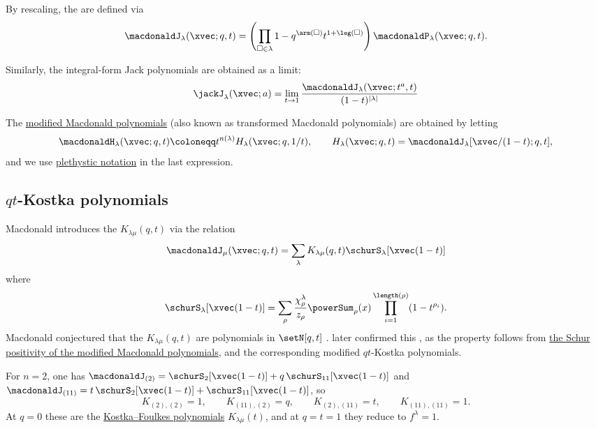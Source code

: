 By rescaling, the
\label{integralFormMacdonaldPolynomial}
are defined via
\begin{equation*}
\macdonaldJ_\lambda(\xvec;q,t)
=
\left(
  \prod_{\square \in \lambda} 1-q^{\arm(\square)}t^{1+\leg(\square)}
\right)
\macdonaldP_\lambda(\xvec;q,t).
\end{equation*}

Similarly, the integral-form Jack polynomials are obtained as a limit:
\[
\jackJ_\lambda(\xvec;a)
=
\lim_{t \to 1}
\frac{\macdonaldJ_\lambda(\xvec;t^a,t)}{(1-t)^{|\lambda|}}
\]

The \hyperref[macdonaldH]{modified Macdonald polynomials}
(also known as transformed Macdonald polynomials) are obtained by letting
\begin{equation*}
\macdonaldH_\lambda(\xvec;q,t) \coloneqq
t^{n(\lambda)}H_\lambda(\xvec;q,1/t),
\qquad
H_\lambda(\xvec;q,t) = \macdonaldJ_\lambda[\xvec/(1-t);q,t],
\end{equation*}
and we use \hyperref[plethysm]{plethystic notation} in the last expression.


\subsection[macdonaldJqtKostka]{$qt$-Kostka polynomials}

Macdonald \cite[p.~354]{Macdonald1987} introduces the
\label{qtKostkaPolynomial}
$K_{\lambda\mu}(q,t)$
via the relation
\[
\macdonaldJ_\mu(\xvec;q,t)
=
\sum_{\lambda} K_{\lambda\mu}(q,t) \schurS_\lambda[\xvec(1-t)]
\]
where
\[
\schurS_\lambda[\xvec(1-t)]
=
\sum_{\rho} \frac{\chi_\rho^\lambda}{z_\rho} \powerSum_\rho(x)
\prod_{i=1}^{\length(\rho)} (1-t^{\rho_i}).
\]
Macdonald conjectured that the $K_{\lambda\mu}(q,t)$ are polynomials in
$\setN[q,t]$ \cite{Macdonald1987}.
 later confirmed this \cite{Haiman2001}, as the property
follows from \hyperref[macdonaldHSchurPositivity]{the Schur positivity of the
modified Macdonald polynomials},
and the corresponding modified $qt$-Kostka polynomials.

\begin{example}
For $n=2$, one has $\macdonaldJ_{(2)}=\schurS_{2}[\xvec(1-t)]+q\,\schurS_{11}[\xvec(1-t)]$
and $\macdonaldJ_{(11)}=t\,\schurS_{2}[\xvec(1-t)]+\schurS_{11}[\xvec(1-t)]$, so
\[
K_{(2),(2)}=1,\qquad K_{(11),(2)}=q,\qquad
K_{(2),(11)}=t,\qquad K_{(11),(11)}=1.
\]
At $q=0$ these are the \hyperref[kostkaFoulkes]{Kostka--Foulkes polynomials}
$K_{\lambda\mu}(t)$, and at $q=t=1$ they reduce to $f^\lambda=1$.
\end{example}

